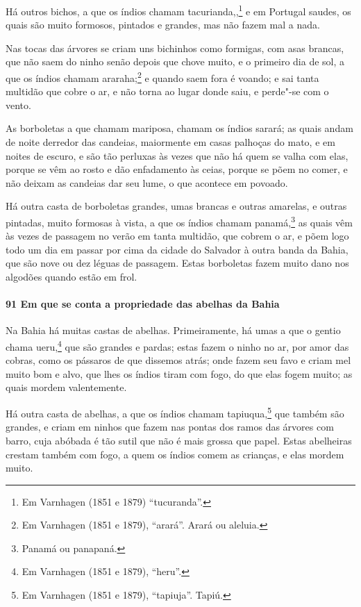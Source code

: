 Há outros bichos, a que os índios chamam tacurianda,,\footnote{ Em Varnhagen (1851 e 1879)
``tucuranda''.} e em Portugal saudes, os quais são muito formosos, pintados e grandes,
mas não fazem mal a nada.

Nas tocas das árvores se criam uns bichinhos como formigas, com asas brancas, que não saem
do ninho senão depois que chove muito, e o primeiro dia de sol, a que os índios chamam
araraha;\footnote{ Em Varnhagen (1851 e 1879), ``arará''. Arará ou aleluia.} e quando saem
fora é voando; e sai tanta multidão que cobre o ar, e não torna ao lugar donde saiu, e
perde"-se com o vento.

As borboletas a que chamam mariposa, chamam os índios sarará; as quais andam de noite
derredor das candeias, maiormente em casas palhoças do mato, e em noites de escuro, e são
tão perluxas às vezes que não há quem se valha com elas, porque se vêm ao rosto e dão
enfadamento às ceias, porque se põem no comer, e não deixam as candeias dar seu lume, o
que acontece em povoado.

Há outra casta de borboletas grandes, umas brancas e outras amarelas, e outras pintadas,
muito formosas à vista, a que os índios chamam panamá,\footnote{ Panamá ou panapaná.} as
quais vêm às vezes de passagem no verão em tanta multidão, que cobrem o ar, e põem logo
todo um dia em passar por cima da cidade do Salvador à outra banda da Bahia, que são nove
ou dez léguas de passagem. Estas borboletas fazem muito dano nos algodões quando estão em
frol.

\paragraph{91 Em que se conta a propriedade das abelhas da Bahia}

Na Bahia há muitas castas de abelhas. Primeiramente, há umas a que o gentio chama
ueru,\footnote{ Em Varnhagen (1851 e 1879), ``heru''.} que são grandes e pardas; estas
fazem o ninho no ar, por amor das cobras, como os pássaros de que dissemos atrás; onde
fazem seu favo e criam mel muito bom e alvo, que lhes os índios tiram com fogo, do que
elas fogem muito; as quais mordem valentemente.

Há outra casta de abelhas, a que os índios chamam tapiuqua,\footnote{ Em Varnhagen (1851 e
1879), ``tapiuja''. Tapiú.} que também são grandes, e criam em ninhos que fazem nas
pontas dos ramos das árvores com barro, cuja abóbada é tão sutil que não é mais grossa que
papel. Estas abelheiras crestam também com fogo, a quem os índios comem as crianças, e
elas mordem muito.

